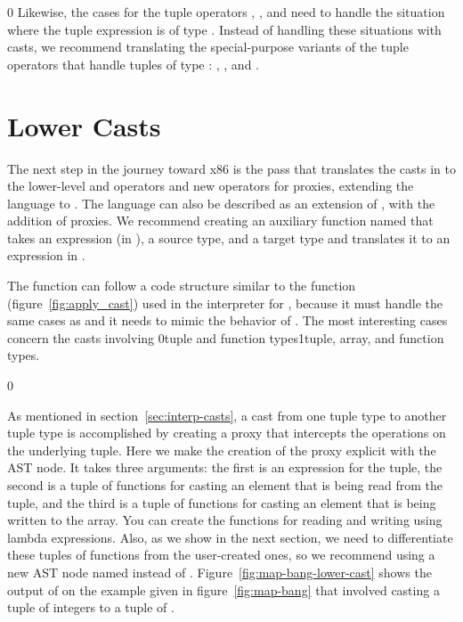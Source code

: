 \documentclass[7x10]{TimesAPriori_MIT}%
\def\racketEd{0}
\def\pythonEd{1}
\def\edition{1}
\newcommand{\racket}[1]{{\if\edition\racketEd{#1}\fi}}
\newcommand{\pythonColor}[0]{}
\newcommand{\python}[1]{{\if\edition\pythonEd\pythonColor #1\fi}}
\numberwithin{theorem}{chapter}
\numberwithin{definition}{chapter}
\numberwithin{equation}{chapter}
\begin{document}
{\if\edition\racketEd
%  
Likewise, the cases for the tuple operators ,
, and  need to handle the situation
where the tuple expression is of type \CANYTY{}. Instead of
handling these situations with casts, we recommend translating
the special-purpose variants of the tuple operators that handle
tuples of type \CANYTY{}: ,
, and .
%
\fi}


\section{Lower Casts }
\label{sec:lower_casts}

The next step in the journey toward x86 is the 
pass that translates the casts in \LangCast{} to the lower-level
 and  operators and new operators for
proxies, extending the \LangLam{} language to \LangProxy{}.
The \LangProxy{} language can also be described as an extension of
\LangAny{}, with the addition of proxies. We recommend creating an
auxiliary function named  that takes an expression
(in \LangCast{}), a source type, and a target type and translates it
to an expression in \LangProxy{}.

The  function can follow a code structure similar to
the  function (figure~\ref{fig:apply_cast}) used in
the interpreter for \LangCast{}, because it must handle the same cases
as  and it needs to mimic the behavior of
. The most interesting cases concern
the casts involving \racket{tuple and function types}\python{tuple, array, and function types}.


{\if\edition\racketEd

As mentioned in section~\ref{sec:interp-casts}, a cast from one tuple
type to another tuple type is accomplished by creating a proxy that
intercepts the operations on the underlying tuple. Here we make the
creation of the proxy explicit with the  AST
node. It takes three arguments: the first is an expression for the
tuple, the second is a tuple of functions for casting an element that is
being read from the tuple, and the third is a tuple of functions for
casting an element that is being written to the array.  You can create
the functions for reading and writing using lambda expressions.  Also,
as we show in the next section, we need to differentiate these tuples
of functions from the user-created ones, so we recommend using a new
AST node named  instead of .
%
Figure~\ref{fig:map-bang-lower-cast} shows the output of
 on the example given in figure~\ref{fig:map-bang}
that involved casting a tuple of integers to a tuple of \CANYTY{}.

\fi}
\end{document}
